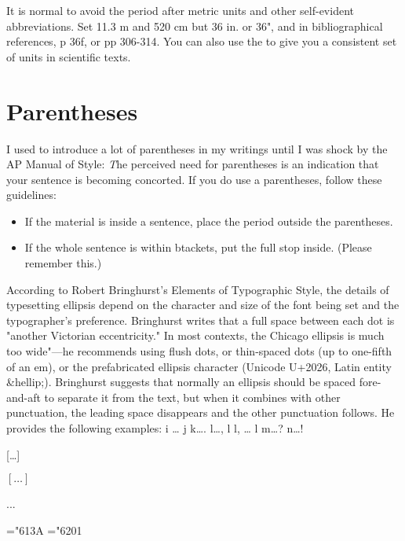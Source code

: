 It is normal to avoid the period after metric units and other self-evident abbreviations. Set 11.3 m and 520 cm but 36 in. or 36", and in bibliographical references, p 36f, or pp 306-314. You can also use the  to give you a consistent set of units in scientific texts.

\section{Parentheses}

I used to introduce a lot of parentheses in my writings until I was shock by the AP Manual of Style:
{\emph The perceived need for parentheses is an indication that your sentence is becoming concorted}. If you do use a parentheses, follow these guidelines:

\begin{itemize}
\item If the material is inside a sentence, place the period outside the parentheses.
\item If the whole sentence is within btackets, put the full stop inside. (Please remember this.)
\end{itemize}

According to Robert Bringhurst's Elements of Typographic Style, the details of typesetting ellipsis depend on the character and size of the font being set and the typographer's preference. Bringhurst writes that a full space between each dot is "another Victorian eccentricity." In most contexts, the Chicago ellipsis is much too wide"—he recommends using flush dots, or thin-spaced dots (up to one-fifth of an em), or the prefabricated ellipsis character (Unicode U+2026, Latin entity \&hellip;). Bringhurst suggests that normally an ellipsis should be spaced fore-and-aft to separate it from the text, but when it combines with other punctuation, the leading space disappears and the other punctuation follows. He provides the following examples:
i … j	k….	l…, l	l, … l	m…?	n…!

[\dots]\lorem

$[\ldots]$\lorem

...\lorem

\begin{teX}
\mathchardef\ldotp="613A %
\mathchardef\cdotp="6201 %

\def\ldots{\mathinner{\ldotp\ldotp\ldotp}}
\def\cdots{\mathinner{\cdotp\cdotp\cdotp}}
\def\vdots{\vbox{\baselineskip4\p@ \lineskiplimit\z@
    \kern6\p@\hbox{.}\hbox{.}\hbox{.}}}
\def\ddots{\mathinner{\mkern1mu\raise7\p@\vbox{\kern7\p@\hbox{.}}\mkern2mu
    \raise4\p@\hbox{.}\mkern2mu\raise\p@\hbox{.}\mkern1mu}}
\def\dots{\relax\ifmmode\ldots\else$\m@th\ldots\,$\fi}
\end{teX}


